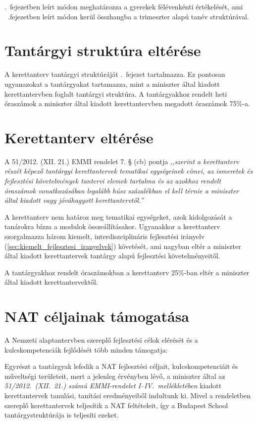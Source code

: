 .~fejezetben leírt módon meghatározza a gyerekek félévenkénti értékelését, ami ~.fejezetben leírt módon kerül összhangba a trimeszter alapú tanév struktúrával.

\section{Tantárgyi struktúra eltérése} 
A kerettanterv tantárgyi struktúráját .~fejezet tartalmazza. Ez pontosan ugyanazokat a tantárgyakat tartamazza, mint a miniszter által kiadott kerettantervben foglalt tantárgyi struktúra. A tantárgyakhoz rendelt heti óraszámok a miniszter által kiadott kerettantervben megadott óraszámok 75\%-a.

\section{Kerettanterv eltérése}
A 51/2012. (XII. 21.) EMMI rendelet 7. § (cb) pontja \emph{,,szerint a kerettanterv részét képező tantárgyi kerettantervek tematikai egységeinek címei, az ismeretek és fejlesztési követelmények tantervi elemek tartalma és az azokhoz rendelt óraszámok vonatkozásában legalább húsz százalékban el kell térnie a miniszter által kiadott vagy jóváhagyott kerettantervtől.''}

A kerettanterv nem határoz meg tematikai egységeket, azok kidolgozását a tanárokra bízza a modulok összeállításakor. Ugyanakkor a kerettanterv szorgalmazza három kiemelt, interdiszciplináris fejlesztési irányelv (\ref{sec:kiemelt_fejlesztesi_iranyelvek}) követését, ami nagyban eltér a miniszter által kiadott kerettantervek tantárgy alapú fejlesztési követelményeitől. 

A tantárgyakhoz rendelt óraszámokban a kerettanterv  25\%-ban eltér a miniszter által kiadott kerettantervektől.

\section{NAT céljainak támogatása}
\label{sec:nat_celjai}
A Nemzeti alaptantervben szereplő fejlesztési célok elérését és a
kulcskompetenciák fejlődését több minden támogatja:

Egyrészt a tantárgyak lefedik a NAT fejlesztési céljait, kulcskompetenciáit és
műveltségi területeit, mert a jelenleg érvényben lévő, a miniszter által az
\emph{51/2012.~(XII.~21.) számú EMMI-rendelet I--IV.~mellékletében} kiadott
kerettantervek \citep{ofi:kerettanterv} tanulási, tanítási eredményeiből
indultunk ki. Mivel a rendeletben szereplő kerettantervek teljesítik a NAT
feltételeit, így a Budapest School tantárgystruktúrája is teljesíti ezeket.

